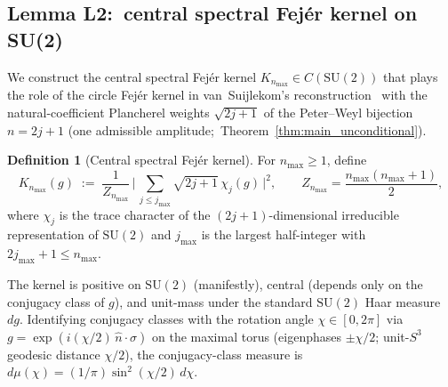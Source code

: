 \documentclass[11pt,a4paper]{article}
\theoremstyle{plain}
\theoremstyle{definition}
\newtheorem{definition}[theorem]{Definition}
\newcommand{\nmax}{n_{\max}}
\newcommand{\sthree}{S^{3}}
\newcommand{\SU}{\mathrm{SU}}
\newcommand{\KS}{K}
\begin{document}
\subsection{Lemma L2:\ central spectral Fej\'er kernel on SU(2)}
\label{sec:L2}

We construct the central spectral Fej\'er kernel
$\KS_{\nmax} \in C(\SU(2))$ that plays the role of the
circle Fej\'er kernel in van~Suijlekom's reconstruction~\cite{vs2021_jgp}
with the natural-coefficient Plancherel weights $\sqrt{2j+1}$ of
the Peter--Weyl bijection $n = 2j + 1$ (one admissible amplitude;\
Theorem~\ref{thm:main_unconditional}).

\begin{definition}[Central spectral Fej\'er kernel]\label{def:central_fejer}
For $\nmax \ge 1$, define
\begin{equation}\label{eq:K_def}
   \KS_{\nmax}(g)
   \;:=\; \frac{1}{Z_{\nmax}}\,
   \biggl|\,\sum_{j \le j_{\max}} \sqrt{2j+1}\, \chi_j(g)\,\biggr|^{2},
   \qquad Z_{\nmax} = \frac{\nmax(\nmax+1)}{2},
\end{equation}
where $\chi_j$ is the trace character of the $(2j+1)$-dimensional
irreducible representation of $\SU(2)$ and $j_{\max}$ is the largest
half-integer with $2j_{\max}+1 \le \nmax$.
\end{definition}

The kernel is positive on $\SU(2)$ (manifestly), central (depends only
on the conjugacy class of $g$), and unit-mass under the standard
$\SU(2)$ Haar measure $dg$. Identifying conjugacy classes with the
rotation angle $\chi \in [0, 2\pi]$ via $g = \exp(i (\chi/2)\, \hat{n}
\cdot \sigma)$ on the maximal torus (eigenphases $\pm\chi/2$;
unit-$\sthree$ geodesic distance $\chi/2$), the
conjugacy-class measure is $d\mu(\chi) = (1/\pi) \sin^2(\chi/2)\, d\chi$.
\end{document}
